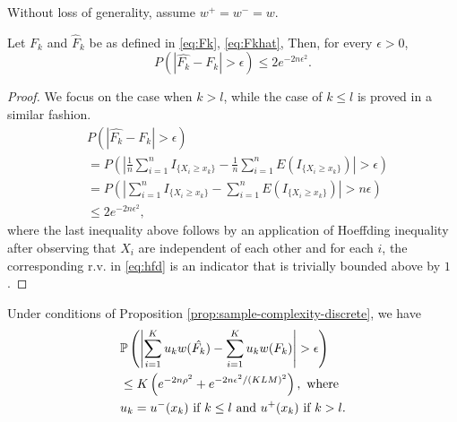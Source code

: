 
Without loss of generality, assume $w^+=w^-=w$.

\begin{proposition}
\label{prop:hoeffding-discrete}
Let $F_k$ and $\hat F_k$ be as defined in \eqref{eq:Fk}, \eqref{eq:Fkhat}, Then, for every $\epsilon >0$, 
$$P(|\hat{F_k}-F_k| > \epsilon) \leq 2 e^{-2n \epsilon^2}.$$
\end{proposition}
\begin{proof}
We focus on the case when $k > l$, while the case of $k \leq l$ is proved in a similar fashion.
\begin{align}
&P(\left|\hat{F_k}- F_k \right| > \epsilon)  \nonumber\\
&= P(\left| \frac{1}{n} \sum_{i=1}^n I_{\{X_i \geq x_k\}} - \frac{1}{n} \sum_{i=1}^n E(I_{\{X_i \geq x_k\}}) \right| > \epsilon) \nonumber\\ 
& = P(\left|\sum_{i=1}^n I_{\{X_i \geq x_k\}} - \sum_{i=1}^n E(I_{\{X_i \geq x_k\}}) \right| > n\epsilon) \label{eq:hfd} \\ 
& \leq 2e^{-2n \epsilon^2},
\end{align}
where the last inequality above follows by an application of Hoeffding inequality after observing that $X_i$ are independent of each other and for each $i$, the corresponding r.v. in \eqref{eq:hfd} is an indicator that is trivially bounded above by $1$.
\end{proof}
\begin{proposition}
\label{prop:discrete-first-term}
Under conditions of Proposition \ref{prop:sample-complexity-discrete}, we have
\begin{align}
&\mathbb{P}\left( \left| \sum_{i=1}^K u_{k} w(\hat{F_k}) - \sum_{i=1}^K u_{k} w(F_k) \right| >\epsilon \right)\nonumber\\
& \le K\left(
e^{-2n\rho^2} + e^{-2n\epsilon^2 /(KLM)^2}\right), \text{ where }\nonumber\\
&u_k = 
   u^{-}(x_{k})  \text{ if   } k \leq l \text{ and } 
   u^{+}(x_{k})  \text{ if  }  k > l.
 \label{eq:uplusminusxk}
\end{align} 
\end{proposition}

